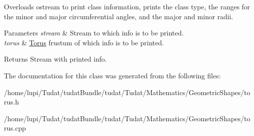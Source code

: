 Overloads ostream to print class information, prints the class type, the ranges for the minor and major circumferential angles, and the major and minor radii. 
\begin{DoxyParams}{Parameters}
{\em stream} & Stream to which info is to be printed. \\
\hline
{\em torus} & \hyperlink{classtudat_1_1geometric__shapes_1_1Torus}{Torus} frustum of which info is to be printed. \\
\hline
\end{DoxyParams}
\begin{DoxyReturn}{Returns}
Stream with printed info. 
\end{DoxyReturn}


The documentation for this class was generated from the following files\+:\begin{DoxyCompactItemize}
\item 
/home/lupi/\+Tudat/tudat\+Bundle/tudat/\+Tudat/\+Mathematics/\+Geometric\+Shapes/torus.\+h\item 
/home/lupi/\+Tudat/tudat\+Bundle/tudat/\+Tudat/\+Mathematics/\+Geometric\+Shapes/torus.\+cpp\end{DoxyCompactItemize}
